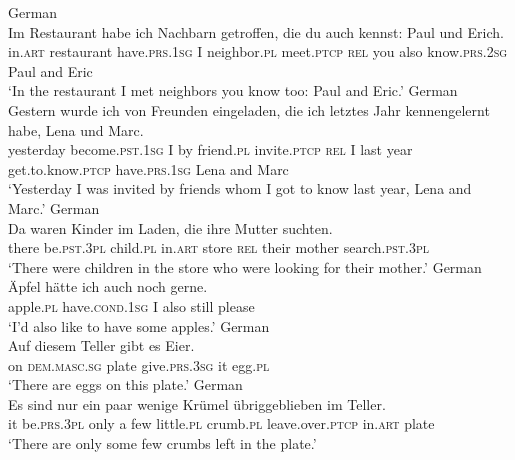 \documentclass[output=paper,colorlinks,citecolor=brown]{langscibook}
\begin{document}
\ea\label{ex:ds31} German\\
\gll Im Restaurant habe ich Nachbarn getroffen, die du auch kennst: Paul und Erich.\\
     in.\textsc{art} restaurant   have.\textsc{prs}.1\textsc{sg} I neighbor.\textsc{pl} meet.\textsc{ptcp} \textsc{rel} you also   know.\textsc{prs.}2\textsc{sg}  Paul  and Eric\\
\glt ‘In the restaurant I met neighbors you know too: Paul and Eric.’ 
\ex\label{ex:ds32} German\\
\gll Gestern wurde ich von Freunden eingeladen, die ich letztes Jahr kennengelernt habe, Lena und Marc.\\
     yesterday become.\textsc{pst.1sg} I      by   friend.\textsc{pl}  invite.\textsc{ptcp} \textsc{rel} I    last   year get.to.know.\textsc{ptcp} have.\textsc{prs}.1\textsc{sg} Lena and Marc\\
\glt ‘Yesterday I was invited by friends whom I got to know last year, Lena and Marc.’
\ex \label{ex:ds33} German\\
\gll Da waren Kinder im Laden, die ihre Mutter suchten.\\
     there be.\textsc{pst.3pl} child.\textsc{pl}   in.\textsc{art} store    \textsc{rel} their mother search.\textsc{pst.3pl}\\
\glt ‘There were children in the store who were looking for their mother.’
\ex\label{ex:ds34} German\\
\gll Äpfel hätte ich auch noch gerne.\\
     apple.\textsc{pl} have.\textsc{cond.1sg} I   also   still  please \\
\glt ‘I’d also like to have some apples.’
\ex\label{ex:ds35} German\\
\gll Auf diesem Teller gibt es Eier.\\
     on  \textsc{dem.masc.sg} plate  give.\textsc{prs.3sg} it  egg.\textsc{pl}\\
\glt ‘There are eggs on this plate.’
\ex\label{ex:ds36} German\\
\gll Es sind nur ein paar wenige Krümel übriggeblieben im Teller.\\
     it be.\textsc{prs.3pl} only a    few   little.\textsc{pl} crumb.\textsc{pl} leave.over.\textsc{ptcp} in.\textsc{art} plate\\
\glt ‘There are only some few crumbs left in the plate.’
\z
\end{document}
